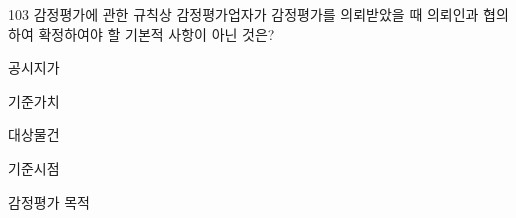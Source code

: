 \begin{question}{103}
감정평가에 관한 규칙상 감정평가업자가 감정평가를 의뢰받았을 때 의뢰인과 협의하여 확정하여야 할 기본적 사항이 아닌 것은?
\begin{choices}
  \item 공시지가
  \item 기준가치
  \item 대상물건
  \item 기준시점
  \item 감정평가 목적
\end{choices}
\end{question}
